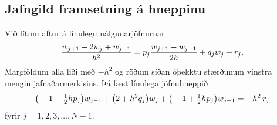 \documentclass[letterpaper,10pt,icelandic]{sphinxmanual}
\begin{document}
\subsection{Jafngild framsetning á hneppinu}
\label{kafli07:jafngild-framsetning-a-hneppinu}
Við lítum aftur á línulegu nálgunarjöfnurnar
\begin{gather}
\begin{split}\dfrac{w_{j+1}-2w_j+w_{j-1}}{h^2}
=p_j\dfrac{w_{j+1}-w_{j-1}}{2h}+q_jw_j+r_j.\end{split}\notag
\end{gather}
Margföldum alla liði með \(-h^2\) og röðum síðan óþekktu stærðunum
vinstra mengin jafnaðarmerkisins. Þá fæst línulega jöfnuhneppið
\begin{gather}
\begin{split}\big(-1-\tfrac 12 h p_j\big)w_{j-1}
+\big(2+h^2q_j\big) w_j
+\big(-1+\tfrac 12 h p_j\big)w_{j+1}
=-h^2\, r_j\end{split}\notag
\end{gather}
fyrir \(j=1,2,3,\dots,N-1\).
\end{document}
